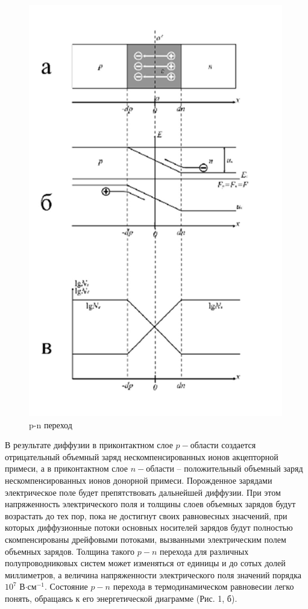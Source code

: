 \documentclass[a4paper, 12pt]{article}
\begin{document}
\begin{figure} 
    \centering
    \includegraphics[width=\linewidth]{img/p-n.png} %
    \caption{p-n переход}
\end{figure}
В результате диффузии в приконтактном слое $p-$области создается отрицательный объемный заряд нескомпенсированных ионов акцепторной примеси, а в приконтактном слое $n-$области – положительный объемный заряд нескомпенсированных ионов 
донорной примеси. Порожденное зарядами электрическое поле 
будет препятствовать дальнейшей диффузии. При этом 
напряженность электрического поля и толщины слоев объемных 
зарядов будут возрастать до тех пор, пока не достигнут своих 
равновесных знасчений, при которых диффузионные потоки 
основных носителей зарядов будут полностью скомпенсированы 
дрейфовыми потоками, вызванными электрическим полем 
объемных зарядов. Толщина такого $p-n$ перехода для различных полупроводниковых систем может изменяться от единицы и до сотых долей миллиметров, а величина напряженности электрического поля значений порядка $10^7$ В$\cdot \text{см}^{-1}$.
Состояние $p-n$ перехода в термодинамическом равновесии легко 
понять, обращаясь к его энергетической диаграмме (Рис. 1, б). 
\end{document}
